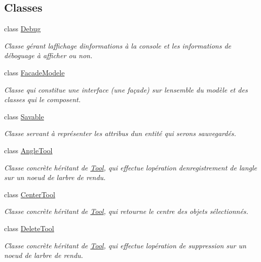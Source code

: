 \subsection*{Classes}
\begin{DoxyCompactItemize}
\item 
class \hyperlink{class_debug}{Debug}
\begin{DoxyCompactList}\small\item\em Classe gérant l\textquotesingle{}affichage d\textquotesingle{}informations à la console et les informations de déboguage à afficher ou non. \end{DoxyCompactList}\item 
class \hyperlink{class_facade_modele}{Facade\+Modele}
\begin{DoxyCompactList}\small\item\em Classe qui constitue une interface (une façade) sur l\textquotesingle{}ensemble du modèle et des classes qui le composent. \end{DoxyCompactList}\item 
class \hyperlink{class_savable}{Savable}
\begin{DoxyCompactList}\small\item\em Classe servant à représenter les attribus d\textquotesingle{}un entité qui serons sauvegardés. \end{DoxyCompactList}\item 
class \hyperlink{class_angle_tool}{Angle\+Tool}
\begin{DoxyCompactList}\small\item\em Classe concrète héritant de \hyperlink{class_tool}{Tool}, qui effectue l\textquotesingle{}opération d\textquotesingle{}enregistrement de l\textquotesingle{}angle sur un noeud de l\textquotesingle{}arbre de rendu. \end{DoxyCompactList}\item 
class \hyperlink{class_center_tool}{Center\+Tool}
\begin{DoxyCompactList}\small\item\em Classe concrète héritant de \hyperlink{class_tool}{Tool}, qui retourne le centre des objets sélectionnés. \end{DoxyCompactList}\item 
class \hyperlink{class_delete_tool}{Delete\+Tool}
\begin{DoxyCompactList}\small\item\em Classe concrète héritant de \hyperlink{class_tool}{Tool}, qui effectue l\textquotesingle{}opération de suppression sur un noeud de l\textquotesingle{}arbre de rendu. \end{DoxyCompactList}\item 

\end{DoxyCompactItemize}
